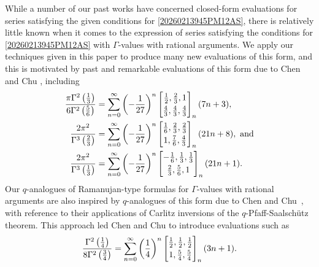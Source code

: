 \documentclass[12pt]{article}
\begin{document}
 While a number of our past works have concerned closed-form evaluations for series satisfying
 the given conditions for \eqref{20260213945PM12AS}, 
 there is relatively little known when it comes to the expression of 
 series satisfying the conditions for 
 \eqref{20260213945PM12AS} with $\Gamma$-values with rational arguments. 
 We apply our techniques given in this paper 
 to produce many new evaluations of this form, 
 and this is motivated by past and remarkable evaluations of this form 
 due to Chen and Chu \cite{ChenChu2024}, including 
\begin{align*}
 \frac{\pi \Gamma^{2}\left( \frac{1}{3} \right)}{ 6 \Gamma^{2}\left( \frac{5}{6} 
 \right) } & = \sum_{n = 0}^{\infty} 
 \left( -\frac{1}{27} \right)^{n} \left[ \begin{matrix} 
 \frac{1}{2}, \frac{2}{3}, 1 
 \vspace{1mm} \\ 
 \frac{4}{3}, \frac{4}{3}, \frac{4}{3}
 \end{matrix} \right]_{n} (7n+3), \\ 
 \frac{2\pi^2}{\Gamma^{3}\left( \frac{2}{3} \right)} & = \sum_{n = 0}^{\infty} 
 \left( -\frac{1}{27} \right)^{n} \left[ \begin{matrix} 
 \frac{1}{6}, \frac{2}{3}, \frac{2}{3} 
 \vspace{1mm} \\ 
 1, \frac{7}{6}, \frac{4}{3}
 \end{matrix} \right]_{n} (21n+8), \ \text{and} \\ 
 \frac{2\pi^2}{\Gamma^{3}\left( \frac{1}{3} \right)} & = \sum_{n = 0}^{\infty} 
 \left( -\frac{1}{27} \right)^{n} \left[ \begin{matrix} 
 -\frac{1}{6}, \frac{1}{3}, \frac{1}{3} 
 \vspace{1mm} \\ 
 \frac{2}{3}, \frac{5}{6}, 1
 \end{matrix} \right]_{n} (21n+1). 
\end{align*}
 Our $q$-analogues of Ramanujan-type formulas for $\Gamma$-values with rational 
 arguments are also inspired by $q$-analogues of this form due to 
 Chen and Chu~\cite{ChenChu2023}, 
 with reference to their applications of 
 Carlitz inversions of
 the $q$-Pfaff-Saalsch\"{u}tz theorem. 
 This approach led Chen and Chu to introduce evaluations such as 
 $$ \frac{\Gamma^{2}\left( \frac{1}{4} \right)}{8 \Gamma^{2}\left( \frac{3}{4} \right) } 
 = \sum_{n = 0}^{\infty} 
 \left( \frac{1}{4} \right)^{n} \left[ \begin{matrix} 
 \frac{1}{2}, \frac{1}{2}, \frac{1}{2} 
 \vspace{1mm} \\ 
 1, \frac{5}{4}, \frac{5}{4}
 \end{matrix} \right]_{n} (3n+1). $$
\end{document}
